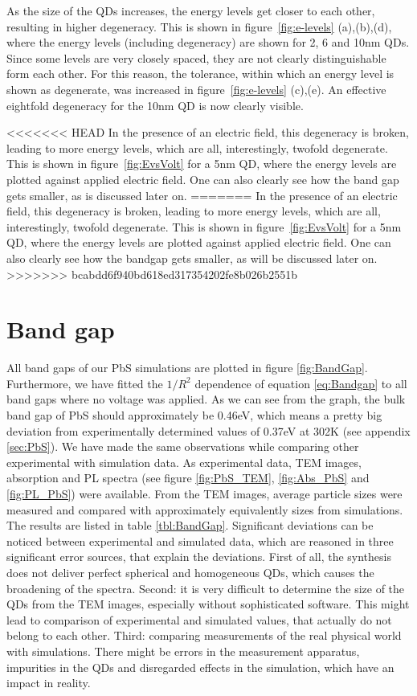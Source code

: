 As the size of the QDs increases, the energy levels get closer to each other, resulting in higher degeneracy. This is shown in figure~\ref{fig:e-levels} (a),(b),(d), where the energy levels (including degeneracy) are shown for 2, 6 and 10nm QDs. Since some levels are very closely spaced, they are not clearly distinguishable form each other. For this reason, the tolerance, within which an energy level is shown as degenerate, was increased in figure~\ref{fig:e-levels} (c),(e). An effective eightfold degeneracy for the 10nm QD is now clearly visible.
	
<<<<<<< HEAD
In the presence of an electric field, this degeneracy is broken, leading to more energy levels, which are all, interestingly, twofold degenerate. This is shown in figure~\ref{fig:EvsVolt} for a 5nm QD, where the energy levels are plotted against applied electric field. One can also clearly see how the band gap gets smaller, as is discussed later on.
=======
In the presence of an electric field, this degeneracy is broken, leading to more energy levels, which are all, interestingly, twofold degenerate. This is shown in figure~\ref{fig:EvsVolt} for a 5nm QD, where the energy levels are plotted against applied electric field. One can also clearly see how the bandgap gets smaller, as will be discussed later on.
>>>>>>> bcabdd6f940bd618ed317354202fe8b026b2551b
\FloatBarrier

\section{Band gap} \label{sec:BandGapAnalysis}
	All band gaps of our PbS simulations are plotted in figure \ref{fig:BandGap}. Furthermore, we have fitted the $1/R^2$ dependence of
	equation \ref{eq:Bandgap} to all band gaps where no voltage was applied.
	As we can see from the graph, the bulk band gap of \gls{PbS} should approximately be 0.46eV, which means a pretty big deviation
	from experimentally determined values of 0.37eV at 302K (see appendix \ref{sec:PbS}). We have made the same observations while comparing
	other experimental with simulation data. As experimental data, \gls{TEM} images, absorption and \gls{PL} spectra (see figure \ref{fig:PbS_TEM},
	\ref{fig:Abs_PbS} and \ref{fig:PL_PbS}) were available. From the \gls{TEM} images, average particle sizes were measured and compared
	with approximately equivalently sizes from simulations. The results are listed in table \ref{tbl:BandGap}. Significant deviations
	can be noticed between experimental and simulated data, which are reasoned in three significant error sources, that explain the deviations.
	First of all, the synthesis does not deliver perfect spherical and homogeneous \glspl{QD}, which causes the broadening of the spectra.
	Second: it is very difficult to determine the size of the \glspl{QD} from the \gls{TEM} images, especially without
	sophisticated software. This might lead to comparison of experimental and simulated values, that actually do not belong to each other.
	Third: comparing measurements of the real physical world with simulations. There might be errors in the measurement
	apparatus, impurities in the \glspl{QD} and disregarded effects in the simulation, which have an impact in reality.
	
